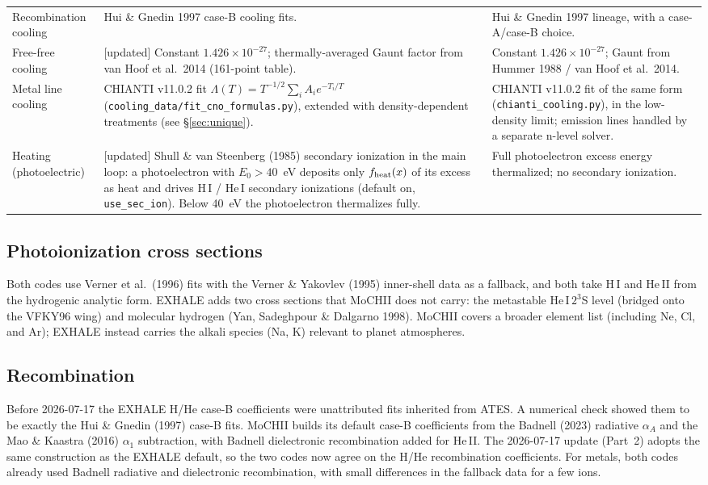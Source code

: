 \documentclass[english,a4paper]{my_memo}
\newcommand{\code}[1]{\texttt{#1}}
\begin{document}
\begin{table}[htbp]
\begin{tabular}{@{}p{}p{}p{}@{}}
Recombination cooling &
Hui \& Gnedin 1997 case-B cooling fits. &
Hui \& Gnedin 1997 lineage, with a case-A/case-B choice. \\

Free-free cooling &
[updated] Constant $1.426\times10^{-27}$; thermally-averaged Gaunt factor
from van Hoof et al.\ 2014 (161-point table). &
Constant $1.426\times10^{-27}$; Gaunt from Hummer 1988 / van Hoof et al.\
2014. \\

Metal line cooling &
CHIANTI v11.0.2 fit $\Lambda(T)=T^{-1/2}\sum_i A_i e^{-T_i/T}$
(\code{cooling\_data/fit\_cno\_formulas.py}), extended with
density-dependent treatments (see \S\ref{sec:unique}). &
CHIANTI v11.0.2 fit of the same form (\code{chianti\_cooling.py}), in the
low-density limit; emission lines handled by a separate n-level solver. \\

Heating (photoelectric) &
[updated] Shull \& van Steenberg (1985) secondary ionization in the main
loop: a photoelectron with $E_0>40$~eV deposits only $f_{\rm heat}(x)$ of its
excess as heat and drives H\,I / He\,I secondary ionizations (default on,
\code{use\_sec\_ion}). Below 40~eV the photoelectron thermalizes fully. &
Full photoelectron excess energy thermalized; no secondary ionization. \\
\bottomrule
\end{tabular}
\end{table}

\subsection{Photoionization cross sections}
Both codes use Verner et al.\ (1996) fits with the Verner \& Yakovlev
(1995) inner-shell data as a fallback, and both take H\,I and He\,II from
the hydrogenic analytic form. EXHALE adds two cross sections that MoCHII
does not carry: the metastable He\,I\,$2^3$S level (bridged onto the
VFKY96 wing) and molecular hydrogen (Yan, Sadeghpour \& Dalgarno 1998).
MoCHII covers a broader element list (including Ne, Cl, and Ar); EXHALE
instead carries the alkali species (Na, K) relevant to planet
atmospheres.

\subsection{Recombination}
Before 2026-07-17 the EXHALE H/He case-B coefficients were unattributed
fits inherited from ATES. A numerical check showed them to be exactly the
Hui \& Gnedin (1997) case-B fits. MoCHII builds its default case-B
coefficients from the Badnell (2023) radiative $\alpha_A$ and the Mao \&
Kaastra (2016) $\alpha_1$ subtraction, with Badnell dielectronic
recombination added for He\,II. The 2026-07-17 update (Part~2) adopts the
same construction as the EXHALE default, so the two codes now agree on the
H/He recombination coefficients. For metals, both codes already used
Badnell radiative and dielectronic recombination, with small differences
in the fallback data for a few ions.
\end{document}
